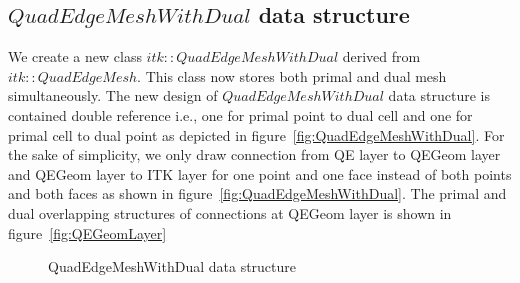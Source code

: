 \documentclass{InsightArticle}
\begin{document}
\subsection{$QuadEdgeMeshWithDual$ data structure}


We create a new class $itk::QuadEdgeMeshWithDual$ derived from $itk::QuadEdgeMesh$. This class now stores both primal and dual mesh simultaneously. The new design of $QuadEdgeMeshWithDual$ data structure is contained double reference i.e., one for primal point to dual cell and one for primal cell to dual point as depicted in figure~\ref{fig:QuadEdgeMeshWithDual}. For the sake of simplicity, we only draw connection from QE layer to QEGeom layer and QEGeom layer to ITK layer for one point and one face instead of both points and both faces as shown in figure~\ref{fig:QuadEdgeMeshWithDual}. The primal and dual overlapping structures of connections at QEGeom layer is shown in figure~\ref{fig:QEGeomLayer}
\begin{figure}
	\centering
	\caption{QuadEdgeMeshWithDual data structure}
	\label{fig:QuadEdgeMeshWithDualFull}
\end{figure}
\end{document}
